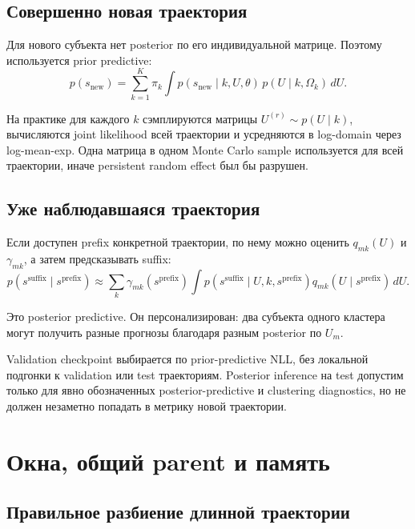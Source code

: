 \documentclass[12pt,a4paper]{article}
\newenvironment{warningbox}{\par\medskip\noindent{\color{red}\bfseries Важно не перепутать. }\ignorespaces}{\par\medskip}
\begin{document}
\subsection{Совершенно новая траектория}

Для нового субъекта нет posterior по его индивидуальной матрице. Поэтому используется prior predictive:
\begin{equation}
p(s_{\mathrm{new}})=\sum_{k=1}^{K}\pi_k\int p(s_{\mathrm{new}}\mid k,U,\theta)\,p(U\mid k,\Omega_k)\,dU.
\label{eq:prior-predictive}
\end{equation}

На практике для каждого \(k\) сэмплируются матрицы \(U^{(r)}\sim p(U\mid k)\), вычисляются joint likelihood всей траектории и усредняются в log-domain через log-mean-exp. Одна матрица в одном Monte Carlo sample используется для всей траектории, иначе persistent random effect был бы разрушен.

\subsection{Уже наблюдавшаяся траектория}

Если доступен prefix конкретной траектории, по нему можно оценить \(q_{mk}(U)\) и \(\gamma_{mk}\), а затем предсказывать suffix:
\begin{equation}
p(s^{\mathrm{suffix}}\mid s^{\mathrm{prefix}})\approx\sum_k\gamma_{mk}(s^{\mathrm{prefix}})\int p(s^{\mathrm{suffix}}\mid U,k,s^{\mathrm{prefix}})q_{mk}(U\mid s^{\mathrm{prefix}})\,dU.
\end{equation}

Это posterior predictive. Он персонализирован: два субъекта одного кластера могут получить разные прогнозы благодаря разным posterior по \(U_m\).

\begin{warningbox}
Validation checkpoint выбирается по prior-predictive NLL, без локальной подгонки к validation или test траекториям. Posterior inference на test допустим только для явно обозначенных posterior-predictive и clustering diagnostics, но не должен незаметно попадать в метрику новой траектории.
\end{warningbox}

\section{Окна, общий parent и память}

\subsection{Правильное разбиение длинной траектории}
\end{document}
